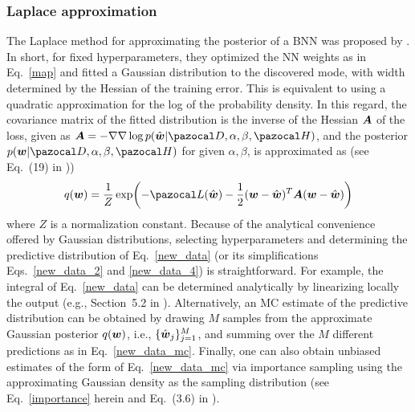 \subsubsection{Laplace approximation}\label{sec:laplace}
The Laplace method for approximating the posterior of a BNN was proposed by \textcite{denker1991transforming}. 
In short, for fixed hyperparameters, they optimized the NN weights as in Eq.~\eqref{map} and fitted a Gaussian distribution to the discovered mode, with width determined by the Hessian of the training error. 
This is equivalent to using a quadratic approximation for the log of the probability density. 
In this regard, the covariance matrix of the fitted distribution is the inverse of the Hessian $\boldsymbol{A}$ of the loss, given as $\bA = -\nabla\nabla\log p(\hat{\bw}|\cD,\alpha,\beta,\cH) $, and the posterior $p(\bw|\cD,\alpha,\beta,\cH)$ for given $\alpha,\beta$, is approximated as (see Eq.~(19) in \cite{mackay1995probable}))
\begin{equation}\label{laplace_posterior}
	q(\bw) = \frac{1}{Z} \exp(-\cL(\hat{\bw}) - \frac{1}{2}(\bw-\hat{\bw})^T\bA(\bw-\hat{\bw}))
\end{equation}
where $Z$ is a normalization constant. 
Because of the analytical convenience offered by Gaussian distributions, selecting hyperparameters and determining the predictive distribution of Eq.~\eqref{new_data} (or its simplifications Eqs.~\eqref{new_data_2} and \eqref{new_data_4}) is straightforward. 
For example, the integral of Eq.~\eqref{new_data} can be determined analytically by linearizing locally the output (e.g., Section~5.2 in \cite{mackay1995probable}).
Alternatively, an MC estimate of the predictive distribution can be obtained by drawing $M$ samples from the approximate Gaussian posterior $q(\boldsymbol{w})$, i.e.,  $\{\hat{\boldsymbol{w}}_j\}_{j=1}^M$, and summing over the $M$ different predictions as in Eq.~\eqref{new_data_mc}.
Finally, one can also obtain unbiased estimates of the form of Eq.~\eqref{new_data_mc} via importance sampling using the approximating Gaussian density as the sampling distribution (see Eq.~\eqref{importance} herein and Eq.~(3.6) in \cite{neal1993probabilistic}).

